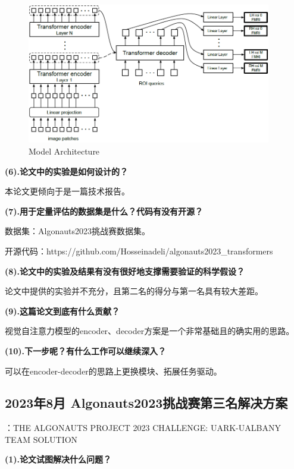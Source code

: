 \documentclass[12pt, a4paper, oneside]{ctexart}
\begin{document}
    \begin{figure}[htbp]
       \centering
       \includegraphics[width=0.95\textwidth]{pic/4.7_model architecture}
       \caption{Model Architecture}
       \label{second team architecture}
    \end{figure}

    \noindent\textbf{(6).论文中的实验是如何设计的？}

    本论文更倾向于是一篇技术报告。

    \noindent\textbf{(7).用于定量评估的数据集是什么？代码有没有开源？}

    数据集：Algonauts2023挑战赛数据集。

    开源代码：https://github.com/Hosseinadeli/algonauts2023\_transformers

    \noindent\textbf{(8).论文中的实验及结果有没有很好地支撑需要验证的科学假设？}

    论文中提供的实验并不充分，且第二名的得分与第一名具有较大差距。

    \noindent\textbf{(9).这篇论文到底有什么贡献？}

    视觉自注意力模型的encoder、decoder方案是一个非常基础且的确实用的思路。

    \noindent\textbf{(10).下一步呢？有什么工作可以继续深入？}

    可以在encoder-decoder的思路上更换模块、拓展任务驱动。

    \subsection{2023年8月 Algonauts2023挑战赛第三名解决方案\cite{nguyen2023algonauts}}
    ：THE ALGONAUTS PROJECT 2023 CHALLENGE: UARK-UALBANY TEAM SOLUTION

    \noindent\textbf{(1).论文试图解决什么问题？}
\end{document}
